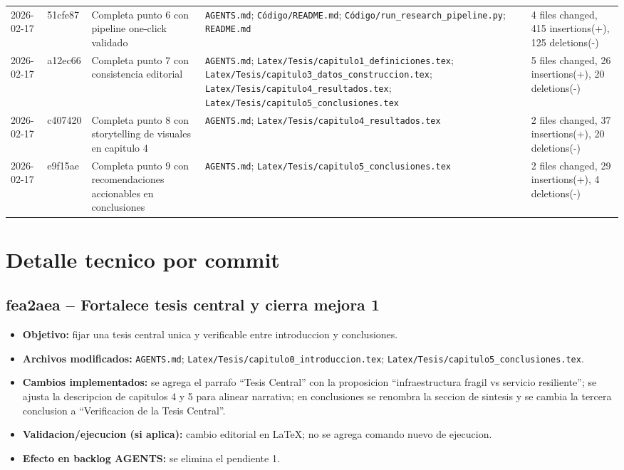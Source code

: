 \documentclass[11pt]{article}
\begin{document}
\begin{longtable}{L{1.8cm}L{1.5cm}L{3.8cm}L{5.6cm}L{2.8cm}}
2026-02-17 & 51cfe87 & Completa punto 6 con pipeline one-click validado &
\texttt{AGENTS.md}; \texttt{C\'odigo/README.md}; \texttt{C\'odigo/run\_research\_pipeline.py}; \texttt{README.md} &
4 files changed, 415 insertions(+), 125 deletions(-) \\

2026-02-17 & a12ec66 & Completa punto 7 con consistencia editorial &
\texttt{AGENTS.md}; \texttt{Latex/Tesis/capitulo1\_definiciones.tex}; \texttt{Latex/Tesis/capitulo3\_datos\_construccion.tex}; \texttt{Latex/Tesis/capitulo4\_resultados.tex}; \texttt{Latex/Tesis/capitulo5\_conclusiones.tex} &
5 files changed, 26 insertions(+), 20 deletions(-) \\

2026-02-17 & c407420 & Completa punto 8 con storytelling de visuales en capitulo 4 &
\texttt{AGENTS.md}; \texttt{Latex/Tesis/capitulo4\_resultados.tex} &
2 files changed, 37 insertions(+), 20 deletions(-) \\

2026-02-17 & e9f15ae & Completa punto 9 con recomendaciones accionables en conclusiones &
\texttt{AGENTS.md}; \texttt{Latex/Tesis/capitulo5\_conclusiones.tex} &
2 files changed, 29 insertions(+), 4 deletions(-) \\
\end{longtable}
\normalsize

\section{Detalle tecnico por commit}

\subsection{fea2aea -- Fortalece tesis central y cierra mejora 1}
\begin{itemize}
  \item \textbf{Objetivo:} fijar una tesis central unica y verificable entre introduccion y conclusiones.
  \item \textbf{Archivos modificados:} \texttt{AGENTS.md}; \texttt{Latex/Tesis/capitulo0\_introduccion.tex}; \texttt{Latex/Tesis/capitulo5\_conclusiones.tex}.
  \item \textbf{Cambios implementados:} se agrega el parrafo ``Tesis Central'' con la proposicion ``infraestructura fragil vs servicio resiliente''; se ajusta la descripcion de capitulos 4 y 5 para alinear narrativa; en conclusiones se renombra la seccion de sintesis y se cambia la tercera conclusion a ``Verificacion de la Tesis Central''.
  \item \textbf{Validacion/ejecucion (si aplica):} cambio editorial en \LaTeX; no se agrega comando nuevo de ejecucion.
  \item \textbf{Efecto en backlog AGENTS:} se elimina el pendiente 1.
\end{itemize}
\end{document}
